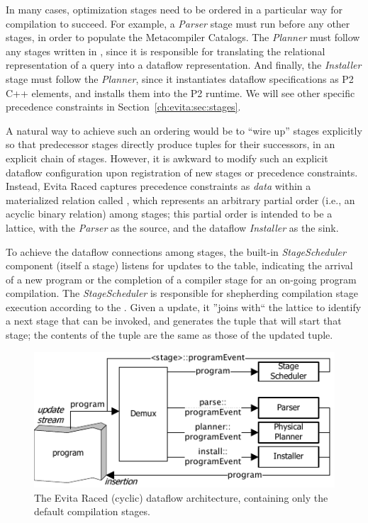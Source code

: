 In many cases, optimization stages need to be ordered in a particular way for
compilation to succeed.  For example, a {\em Parser} stage must run before any
other stages, in order to populate the Metacompiler Catalogs.  The {\em
Planner} must follow any stages written in \OVERLOG, since it is responsible
for translating the relational representation of a query into a dataflow
representation.  And finally, the {\em Installer} stage must follow the {\em
Planner}, since it instantiates dataflow specifications as P2 C++ elements, and
installs them into the P2 runtime.  We will see other specific precedence
constraints in Section~\ref{ch:evita:sec:stages}.

A natural way to achieve such an ordering would be to ``wire up'' stages
explicitly so that predecessor stages directly produce
 tuples for their successors, in an explicit chain of
stages.  However, it is awkward to modify such an explicit dataflow
configuration upon registration of new stages or precedence constraints.
Instead, Evita Raced captures precedence constraints as {\em data} within a
materialized relation called , which represents an arbitrary
partial order (i.e., an acyclic binary relation) among stages; this partial
order is intended to be a lattice, with the {\em Parser} as the source, and the
dataflow {\em Installer} as the sink.  
 
To achieve the dataflow connections among stages, the built-in {\em
StageScheduler} component (itself a stage) listens for updates to the
 table, indicating the arrival of a new \OVERLOG program or the
completion of a compiler stage for an on-going program compilation.  The {\em
StageScheduler} is responsible for shepherding compilation stage execution
according to the .  Given a  update, it ''joins with`` the
lattice to identify a next stage that can be invoked, and generates the
 tuple that will start that stage; the contents of
the tuple are the same as those of the updated  tuple.

\begin{figure}[htbp]
\begin{center}
\includegraphics[scale=1.5]{figures/DefaultCompiler}
\ssp
\caption{The Evita Raced (cyclic) dataflow architecture, containing only the default compilation stages.}
\label{ch:evita:fig:basecompiler}
\end{center}
\end{figure}

